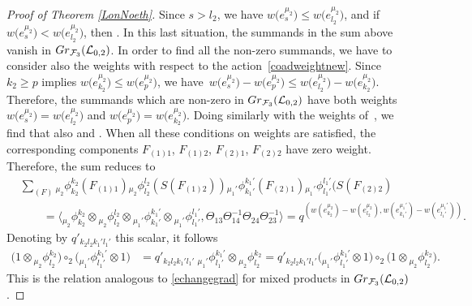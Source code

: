 \documentclass[11pt]{article}
\numberwithin{equation}{section}
\numberwithin{equation}{section}
\theoremstyle{definition}
\newcommand{\Ll}{{\mathcal L}}
\begin{document}
\begin{proof}[Proof of Theorem \ref{LonNoeth}]
Since $s>l_2$, we have $w\big(e_{s}^{\mu_2}\big)\leq w\big(e_{l_2}^{\mu_2}\big)$, and if $w\big(e_{s}^{\mu_2}\big) < w\big(e_{l_2}^{\mu_2}\big)$, then . In this last situation, the summands  in the sum above vanish in ${\rm Gr}_{\mathcal{F}_3}(\Ll_{0,2})$. In order to find all the non-zero summands, we have to consider also the weights with respect to the action~\eqref{coadweightnew}. Since $k_2\geq p$ implies $w\big(e_{k_2}^{\mu_2}\big)\leq w\big(e_{p}^{\mu_2}\big)$, we have~${w\big(e_{s}^{\mu_2}\big)-w\big(e_{p}^{\mu_2}\big) \leq w\big(e_{l_2}^{\mu_2}\big)-w\big(e_{k_2}^{\mu_2}\big)}$. Therefore, the summands which are non-zero in ${{\rm Gr}_{\mathcal{F}_3}(\Ll_{0,2})}$ have both weights $w\big(e_{s}^{\mu_2}\big) = w\big(e_{l_2}^{\mu_2}\big)$ and $w\big(e_{p}^{\mu_2}\big) = w\big(e_{k_2}^{\mu_2}\big)$. Doing similarly with the weights of~, we find that also  and . When all these conditions on weights are satisfied, the corresponding components $F_{(1)1}$, $F_{(1)2}$, $F_{(2)1}$, $F_{(2)2}$ have zero weight. Therefore, the sum reduces to
\begin{align*}
&\sum_{(F)} {}_{{\mu_2}}\phi_{k_2}^{k_2}(F_{(1)1}){}_{{\mu_2}}\phi_{l_2}^{l_2}(S(F_{(1)2})){}_{{\mu_1'}}\phi_{k_1'}^{k_1'}(F_{(2)1}){}_{{\mu_1'}}\phi_{l_1'}^{l_1'}(S(F_{(2)2}) \\ & \qquad =\big\langle {}_{{\mu_2}}\phi_{k_2}^{k_2}\otimes {}_{{\mu_2}}\phi_{l_2}^{l_2}\otimes {}_{{\mu_1'}}\phi_{k_1'}^{k_1'}\otimes {}_{{\mu_1'}}\phi_{l_1'}^{l_1'}, \Theta_{13}\Theta_{14}^{-1}\Theta_{24}\Theta_{23}^{-1}\big\rangle = q^{(w(e_{k_2}^{\mu_2})-w(e_{l_2}^{\mu_2}), w(e_{k_1'}^{\mu_1'}) - w(e_{l_1'}^{\mu_1'}) )}.
\end{align*}
Denoting by $q'_{k_2l_2k_1'l_1'}$ this scalar, it follows
\begin{align*}
\big(1 \otimes {}_{{\mu_2}}\phi^{k_2}_{l_2}\big) \circ_2 \big({}_{{\mu_1'}}\phi^{k_1'}_{l_1'} \otimes 1\big) & = q'_{k_2l_2k_1'l_1'} \ {}_{{\mu_1'}}\phi^{k_1'}_{l_1'} \otimes {}_{{\mu_2}}\phi^{k_2}_{l_2} = q'_{k_2l_2k_1'l_1'} \big({}_{{\mu_1'}}\phi^{k_1'}_{l_1'} \otimes 1\big)\circ_2 \big(1 \otimes {}_{{\mu_2}}\phi^{k_2}_{l_2}\big).
\end{align*}
This is the relation analogous to \eqref{echangegrad} for mixed products in ${\rm Gr}_{\mathcal{F}_3}(\Ll_{0,2})$.


\end{proof}
\end{document}
